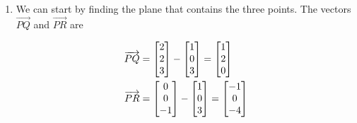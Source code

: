 \begin{enumerate}
\item
We can start by finding the plane that contains the three points. The vectors $\overrightarrow{PQ}$ and $\overrightarrow{PR}$ are 

\begin{align*}
\overrightarrow{PQ} &= \begin{bmatrix} 2 \\ 2 \\ 3 \end{bmatrix} - \begin{bmatrix} 1 \\ 0 \\ 3 \end{bmatrix}  = \begin{bmatrix} 1 \\ 2 \\ 0 \end{bmatrix} \\
\overrightarrow{PR} &= \begin{bmatrix} 0 \\ 0 \\ -1 \end{bmatrix} - \begin{bmatrix} 1 \\ 0 \\ 3 \end{bmatrix}  =  \begin{bmatrix} -1 \\ 0 \\ -4 \end{bmatrix}
\end{align*}


\end{enumerate}
